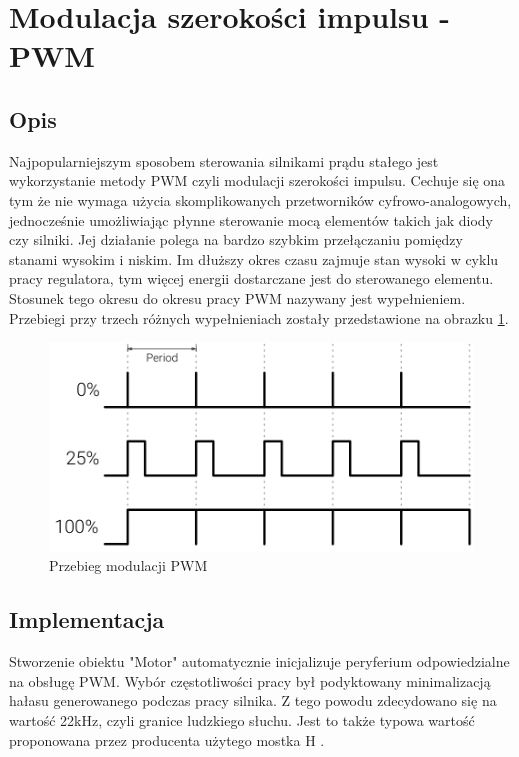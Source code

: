     \section{Modulacja szerokości impulsu - PWM} 
        \subsection{Opis}
            Najpopularniejszym sposobem sterowania silnikami prądu stałego jest wykorzystanie metody PWM \cite{pwm} czyli modulacji szerokości impulsu. Cechuje się ona tym że nie wymaga użycia skomplikowanych przetworników cyfrowo-analogowych, jednocześnie umożliwiając płynne sterowanie mocą elementów takich jak diody czy silniki. Jej działanie polega na bardzo szybkim przełączaniu pomiędzy stanami wysokim i niskim. Im dłuższy okres czasu zajmuje stan wysoki w cyklu pracy regulatora, tym więcej energii dostarczane jest do sterowanego elementu. Stosunek tego okresu do okresu pracy PWM nazywany jest wypełnieniem. Przebiegi przy trzech różnych wypełnieniach zostały przedstawione na obrazku \ref{fig:pwm_duty}.
            
            \vspace{1em}
                                
            \begin{figure}[ht]
                \centering
                \includegraphics[width=1\textwidth]{img/pwm-duty.png}
                \caption{Przebieg modulacji PWM}
                \label{fig:pwm_duty}
            \end{figure}
            
            \vspace{1em}
        
        
        \subsection{Implementacja}
            Stworzenie obiektu "Motor" automatycznie inicjalizuje peryferium odpowiedzialne na obsługę PWM. Wybór częstotliwości pracy był podyktowany minimalizacją hałasu generowanego podczas pracy silnika. Z tego powodu zdecydowano się na wartość 22kHz, czyli granice ludzkiego słuchu. Jest to także typowa wartość proponowana przez producenta użytego mostka H \cite{mostek}.
            

